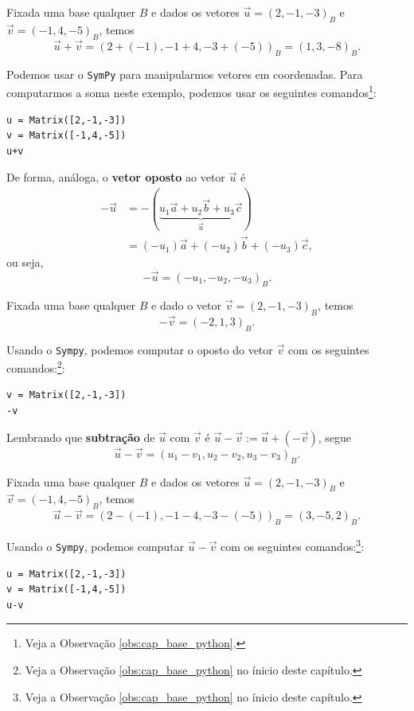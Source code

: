 \begin{ex}
  Fixada uma base qualquer $B$ e dados os vetores $\vec{u} = (2, -1, -3)_B$ e $\vec{v} = (-1, 4, -5)_B$, temos
  \begin{equation}
    \vec{u}+\vec{v} = \left(2+(-1), -1+4, -3+(-5)\right)_B = (1,3,-8)_B.
  \end{equation}

  \ifispython
  Podemos usar o \verb+SymPy+ para manipularmos vetores em coordenadas. Para computarmos a soma neste exemplo, podemos usar os seguintes comandos\footnote{Veja a Observação \ref{obs:cap_base_python}.}:
\begin{verbatim}
u = Matrix([2,-1,-3])
v = Matrix([-1,4,-5])
u+v
\end{verbatim}
  \fi
\end{ex}

De forma, análoga, o {\bf vetor oposto} ao vetor $\vec{u}$ é
\begin{align}
  -\vec{u} &= -(\underbrace{u_1\vec{a} + u_2\vec{b} + u_3\vec{c}}_{\vec{u}})\\
           &= (-u_1)\vec{a} + (-u_2)\vec{b} + (-u_3)\vec{c},
\end{align}
ou seja,
\begin{equation}
  -\vec{u} = (-u_1, -u_2, -u_3)_B.
\end{equation}

\begin{ex}
  Fixada uma base qualquer $B$ e dado o vetor $\vec{v} = (2, -1, -3)_B$, temos
  \begin{equation}
    -\vec{v} = \left(-2, 1, 3\right)_B.
  \end{equation}

  \ifispython
  Usando o \verb+Sympy+, podemos computar o oposto do vetor $\vec{v}$ com os seguintes comandos:\footnote{Veja a Observação \ref{obs:cap_base_python} no ínicio deste capítulo.}:
\begin{verbatim}
v = Matrix([2,-1,-3])
-v
\end{verbatim}
  \fi
\end{ex}


Lembrando que {\bf subtração} de $\vec{u}$ com $\vec{v}$ é $\vec{u}-\vec{v} := \vec{u} + (-\vec{v})$, segue
\begin{equation}
  \vec{u}-\vec{v} = (u_1-v_1, u_2-v_2, u_3-v_3)_B.
\end{equation}

\begin{ex}
  Fixada uma base qualquer $B$ e dados os vetores $\vec{u} = (2, -1, -3)_B$ e $\vec{v} = (-1, 4, -5)_B$, temos
  \begin{equation}
    \vec{u}-\vec{v} = \left(2-(-1), -1-4, -3-(-5)\right)_B = (3,-5,2)_B.
  \end{equation}

  \ifispython
  Usando o \verb+Sympy+, podemos computar $\vec{u}-\vec{v}$ com os seguintes comandos:\footnote{Veja a Observação \ref{obs:cap_base_python} no ínicio deste capítulo.}:
\begin{verbatim}
u = Matrix([2,-1,-3])
v = Matrix([-1,4,-5])
u-v
\end{verbatim}
  \fi
\end{ex}


